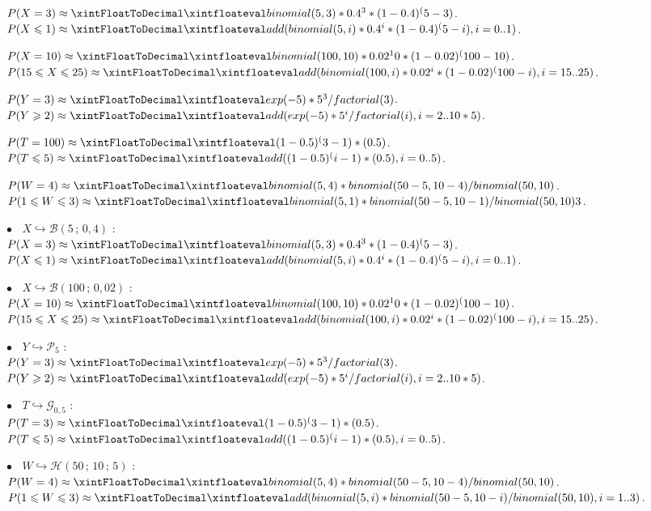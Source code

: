 \documentclass{article}
\begin{document}
\begin{codetex}
$P(X=3) \approx \calcPbinomP{5}{0.4}{3}$.
$P(X\leqslant1) \approx \calcPbinomC{5}{0.4}{*}{1}$.

$P(X=10) \approx \calcPbinomP{100}{0.02}{10}$.
$P(15\leqslant X\leqslant25) \approx \calcPbinomC{100}{0.02}{15}{25}$.

$P(Y=3) \approx \calcPpoissP{5}{3}$.
$P(Y\geqslant2) \approx \calcPpoissC{5}{2}{*}$.

$P(T=100) \approx \calcPgeomP{0.5}{3}$.
$P(T\leqslant5) \approx \calcPgeomC{0.5}{*}{5}$.

$P(W=4) \approx \calcPhypergeomP{50}{10}{5}{4}$.
$P(1\leqslant W\leqslant3) \approx \calcPhypergeomP{50}{10}{5}{1}{3}$.
\end{codetex}

\begin{codesortie}
$\bullet~~~~X \hookrightarrow \mathcal{B}(5\,;\,0,4)$ :\\
$P(X=3) \approx \calcPbinomP{5}{0.4}{3}$.\\
$P(X\leqslant1) \approx \calcPbinomC{5}{0.4}{*}{1}$.

\medskip

$\bullet~~~~X \hookrightarrow \mathcal{B}(100\,;\,0,02)$ :\\
$P(X=10) \approx \calcPbinomP{100}{0.02}{10}$.\\
$P(15\leqslant X\leqslant25) \approx \calcPbinomC{100}{0.02}{15}{25}$.

\medskip

$\bullet~~~~Y \hookrightarrow \mathcal{P}_5$ :\\
$P(Y=3) \approx \calcPpoissP{5}{3}$.\\
$P(Y\geqslant2) \approx \calcPpoissC{5}{2}{*}$.

\medskip

$\bullet~~~~T \hookrightarrow \mathcal{G}_{0,5}$ :\\
$P(T=3) \approx \calcPgeomP{0.5}{3}$.\\
$P(T\leqslant5) \approx \calcPgeomC{0.5}{*}{5}$.

\medskip

$\bullet~~~~W \hookrightarrow \mathcal{H}(50\,;\,10\,;\,5)$ :\\
$P(W=4) \approx \calcPhypergeomP{50}{10}{5}{4}$.\\
$P(1\leqslant W\leqslant3) \approx \calcPhypergeomC{50}{10}{5}{1}{3}$.
\end{codesortie}
\end{document}
